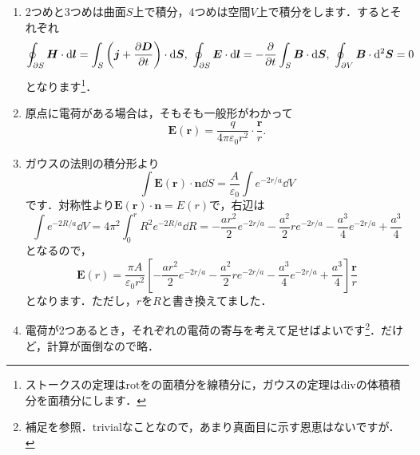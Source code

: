 \documentclass[a4paper,pdflatex,ja=standard]{bxjsarticle}
\begin{document}
\begin{enumerate}
  \item 
  2つめと3つめは曲面$S$上で積分，4つめは空間$V$上で積分をします．するとそれぞれ
  \begin{equation}
    \oint_{\partial S}\bm{H}\cdot\dd \bm{l}
    =
    \int_{S}
    \left(  
      \bm{j}
      +
      \pdv{\bm{D}}{t}
    \right)
    \cdot
    \dd \bm{S}
    ,\ 
    \oint_{\partial S}\bm{E}\cdot\dd \bm{l}
    =
    -
    \pdv{}{t}
    \int_{S}
    \bm{B}
    \cdot
    \dd \bm{S}
    ,\ 
    \oint_{\partial V}
    \bm{B}\cdot\dd^2 \bm{S}
    =
    0
  \end{equation}
  となります\footnote{
    ストークスの定理は$\text{rot}$をの面積分を線積分に，ガウスの定理は$\text{div}$の体積積分を面積分にします．
  }．

  \item 
  原点に電荷がある場合は，そもそも一般形がわかって
  \begin{equation}
    \bm{E}(\bm{r})
    =
    \frac{q}{4\pi \varepsilon_0 r^2}\cdot\frac{\bm{r}}{r}
    .
  \end{equation}

  \item 
  ガウスの法則の積分形より
  \begin{equation}
    \int
    \bm{E}(\bm{r})
    \cdot
    \bm{n}
    \dd S
    =
    \frac{A}{\varepsilon_0}
    \int
    e^{-2r/a}
    \dd V
  \end{equation}
  です．対称性より$\bm{E}(\bm{r})\cdot\bm{n}=E(r)$で，右辺は
  \begin{equation}
    \int
    e^{-2R/a}
    \dd V
    =
    4\pi^2
    \int_0^r
    R^2e^{-2R/a}
    \dd R
    =
    -
    \frac{ar^2}{2}e^{-2r/a}
    -
    \frac{a^2}{2}re^{-2r/a}
    -
    \frac{a^3}{4}e^{-2r/a}
    +
    \frac{a^3}{4}
  \end{equation}
  となるので，
  \begin{equation}
    \bm{E}(r)
    =
    \frac{\pi A}{\varepsilon_0r^2}
    \left[  
      -
    \frac{ar^2}{2}e^{-2r/a}
    -
    \frac{a^2}{2}re^{-2r/a}
    -
    \frac{a^3}{4}e^{-2r/a}
    +
    \frac{a^3}{4}
    \right]
    \frac{\bm{r}}{r}
  \end{equation}
  となります．ただし，$r$を$R$と書き換えてました．

  \item 
  電荷が2つあるとき，それぞれの電荷の寄与を考えて足せばよいです\footnote{
    補足を参照．trivialなことなので，あまり真面目に示す恩恵はないですが．
  }．だけど，計算が面倒なので略．


\end{enumerate}
\end{document}
